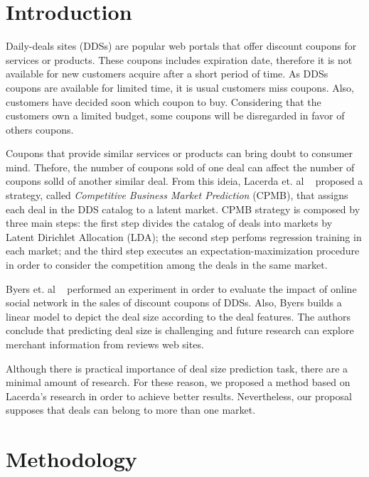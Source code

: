 \documentclass{acm_proc_article-sp}
\begin{document}


\section{Introduction}

Daily-deals sites (DDSs) are popular web portals that offer discount coupons 
for services or products. These coupons includes expiration date, therefore 
it is not available for new customers acquire after a short period of time. 
As DDSs coupons are available for limited time, it is usual customers 
miss coupons. Also, customers have decided soon which coupon to buy. 
Considering that the customers own a limited budget, some coupons 
will be disregarded in favor of others coupons.

Coupons that provide similar services or products can bring doubt to 
consumer mind. Thefore, the number of coupons sold of one deal  
can affect the number of coupons solld of another similar deal. From this ideia, 
Lacerda et. al ~\cite{lacerda2014context} proposed a 
strategy, called \emph{Competitive Business Market Prediction} 
(CPMB),
that assigns each deal in the DDS catalog to a latent 
market. CPMB strategy is composed by three main steps:
the first step divides the catalog of deals into markets 
by Latent Dirichlet Allocation (LDA); the second step perfoms 
regression training in each market; and the third step executes an 
expectation-maximization  procedure in order to consider the 
competition among the deals in the same market.

Byers et. al ~\cite{BMZ12} performed an experiment in order to evaluate 
the impact of online social network in the sales of discount coupons 
of DDSs. Also, Byers builds a linear model to depict the deal size 
according to the deal features. The authors conclude that predicting 
deal size is challenging and future research can explore merchant information 
from reviews web sites.

Although there is practical importance of deal size prediction task, 
there are a minimal amount of research. For these reason, we proposed 
a method based on Lacerda's research in order to achieve better results. 
Nevertheless, our proposal supposes that deals can belong to more than 
one market. %

\section{Methodology}
\end{document}

